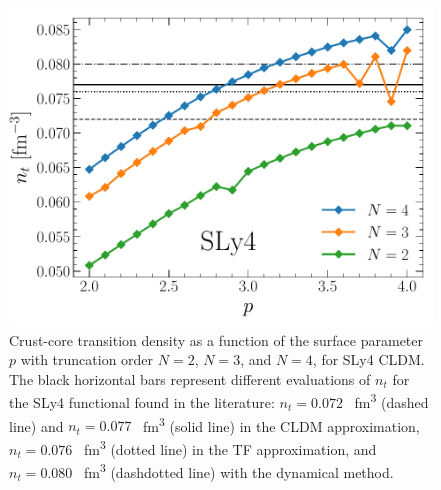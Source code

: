 \begin{figure}[!t]
\begin{center}
  \includegraphics[width=0.8\linewidth]{figures/sly4_nt.pdf}
\end{center}
\caption[Crust-core transition density versus surface parameter $p$ for SLy4]{Crust-core 
  transition density as a function of the surface parameter  
$p$ with truncation order $N=2$, $N=3$, and $N=4$, for SLy4 CLDM. The black
horizontal bars represent different evaluations of $n_t$ for the SLy4
functional found in the literature: $n_t=0.072$ \si{\per \cubic\femto\meter} \cite{Vinas2017}
(dashed line) and $n_t=0.077$ \si{\per \cubic\femto\meter} \cite{Douchin2000a} 
(solid line) in the CLDM approximation, 
$n_t=0.076$ \si{\per \cubic\femto\meter} \cite{Vinas2017} (dotted line) in the
TF approximation, and $n_t=0.080$ \si{\per \cubic\femto\meter} \cite{Vinas2017} 
(dashdotted line) with the dynamical method.}\label{fig:sly4_nt}
\end{figure}

